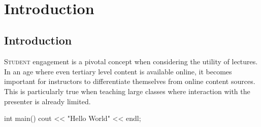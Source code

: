 \documentclass[a4paper,twoside,12pt]{report}
\begin{document}
{}

\setlength{\nomlabelwidth}{2cm}

%
%


%
%
%


\printnomenclature

\newpage 
~\thispagestyle{empty}\newpage
{}

\chapter{Introduction}

\section{Introduction}
\lettrine{S}{tudent} engagement is a pivotal concept when considering the utility of lectures.
In an age where even tertiary level content is available online, it becomes important for instructors to differentiate themselves from online content sources.
This is particularly true when teaching large classes where interaction with the presenter is already limited.

\begin{cpp}
int main(){
	cout << "Hello World" << endl;
}
\end{cpp}


\nocite{*}

\end{document}
